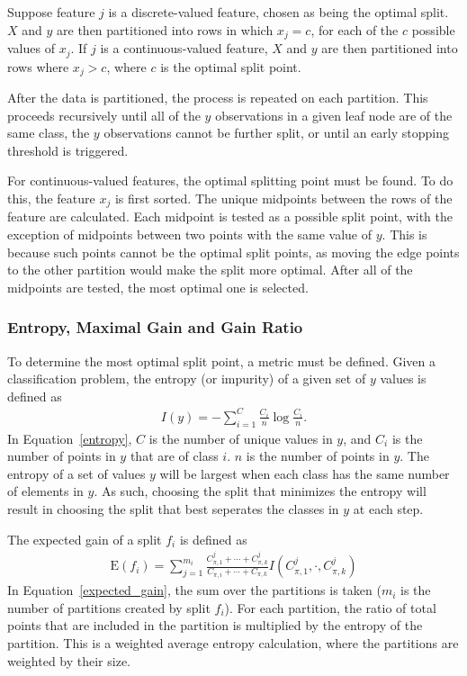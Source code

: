 \documentclass{amsart}
\begin{document}
    Suppose feature $j$ is a discrete-valued feature, chosen as being the optimal split.
    $X$ and $y$ are then partitioned into rows in which $x_j = c$, for each of the $c$ possible values of
    $x_j$. If $j$ is a continuous-valued feature, $X$ and $y$ are then partitioned into rows
    where $x_j > c$, where $c$ is the optimal split point.

    After the data is partitioned, the process is repeated on each partition. This proceeds recursively
    until all of the $y$ observations in a given leaf node are of the same class, the $y$
    observations cannot be further split, or until an early stopping threshold is triggered.

    For continuous-valued features, the optimal splitting point must be found.
    To do this, the feature $x_j$ is first sorted. The unique midpoints between the
    rows of the feature are calculated. Each midpoint is tested as a possible split point,
    with the exception of midpoints between two points with the same value of $y$. This
    is because such points cannot be the optimal split points, as moving the edge points
    to the other partition would make the split more optimal. After all of the midpoints are tested,
    the most optimal one is selected.

    \subsubsection{Entropy, Maximal Gain and Gain Ratio}

    To determine the most optimal split point, a metric must be defined. Given a classification
    problem, the entropy (or impurity) of a given set of $y$ values is defined as
    \begin{align}
        I(y) = -\sum_{i=1}^{C} \frac{C_i}{n} \log \frac{C_i}{n}.
    \label{entropy}
    \end{align}
    In Equation~\ref{entropy}, $C$ is the number of unique values in $y$, and $C_i$ is the number
    of points in $y$ that are of class $i$. $n$ is the number of points in $y$. The entropy of a
    set of values $y$ will be largest when each class has the same number of elements in $y$.
    As such, choosing the split that minimizes the entropy will result in choosing the split
    that best seperates the classes in $y$ at each step.

    The expected gain of a split $f_i$ is defined as
    \begin{align}
        \textrm{E}(f_i) = \sum_{j=1}^{m_i}
        \frac{C_{\pi, 1}^j + \cdots + C_{\pi, k}^j}
        {C_{\pi, i} + \cdots + C_{\pi, k}} I(C_{\pi, 1}^j, \cdot, C_{\pi, k}^j)
        \label{expected_gain}
    \end{align}
    In Equation~\ref{expected_gain}, the sum over the partitions is taken ($m_i$ is
    the number of partitions created by split $f_i$).
    For each partition,
    the ratio of total points that are included in the partition is multiplied by the
    entropy of the partition. This is a weighted average entropy calculation, where the partitions
    are weighted by their size.
\end{document}

